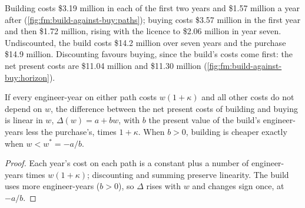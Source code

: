Building costs \$3.19 million in each of the first two years and \$1.57 million a year after (\cref{fig:fm:build-against-buy:paths}); buying costs \$3.57 million in the first year and
then \$1.72 million, rising with the licence to \$2.06 million in year seven. Undiscounted, the build costs \$14.2 million over seven years and the
purchase \$14.9 million. Discounting favours buying, since the build's costs come first: the net present costs are \$11.04 million and \$11.30
million (\cref{fig:fm:build-against-buy:horizon}).

\begin{omfigure}

\label{fig:fm:build-against-buy:horizon}
\end{omfigure}

\begin{proposition}\label{prop:fm:build-against-buy:wage}
If every engineer-year on either path costs $w(1+\kappa)$ and all other costs do not depend on $w$, the difference between the net present costs of
building and buying is linear in $w$, $\Delta(w)=a+bw$, with $b$ the present value of the build's engineer-years less the purchase's, times
$1+\kappa$. When $b>0$, building is cheaper exactly when $w<w^*=-a/b$.
\end{proposition}

\begin{proof}
Each year's cost on each path is a constant plus a number of engineer-years times $w(1+\kappa)$; discounting and summing preserve linearity. The
build uses more engineer-years ($b>0$), so $\Delta$ rises with $w$ and changes sign once, at $-a/b$.
\end{proof}

